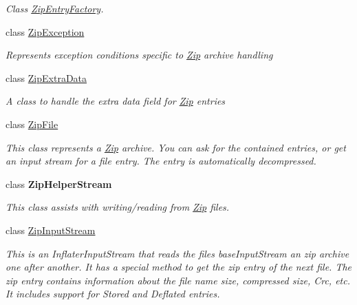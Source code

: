 \begin{DoxyCompactItemize}
\begin{DoxyCompactList}\small\item\em Class \hyperlink{class_i_c_sharp_code_1_1_sharp_zip_lib_1_1_zip_1_1_zip_entry_factory}{Zip\+Entry\+Factory}. \end{DoxyCompactList}\item 
class \hyperlink{class_i_c_sharp_code_1_1_sharp_zip_lib_1_1_zip_1_1_zip_exception}{Zip\+Exception}
\begin{DoxyCompactList}\small\item\em Represents exception conditions specific to \hyperlink{namespace_i_c_sharp_code_1_1_sharp_zip_lib_1_1_zip}{Zip} archive handling \end{DoxyCompactList}\item 
class \hyperlink{class_i_c_sharp_code_1_1_sharp_zip_lib_1_1_zip_1_1_zip_extra_data}{Zip\+Extra\+Data}
\begin{DoxyCompactList}\small\item\em A class to handle the extra data field for \hyperlink{namespace_i_c_sharp_code_1_1_sharp_zip_lib_1_1_zip}{Zip} entries \end{DoxyCompactList}\item 
class \hyperlink{class_i_c_sharp_code_1_1_sharp_zip_lib_1_1_zip_1_1_zip_file}{Zip\+File}
\begin{DoxyCompactList}\small\item\em This class represents a \hyperlink{namespace_i_c_sharp_code_1_1_sharp_zip_lib_1_1_zip}{Zip} archive. You can ask for the contained entries, or get an input stream for a file entry. The entry is automatically decompressed. \end{DoxyCompactList}\item 
class {\bfseries Zip\+Helper\+Stream}
\begin{DoxyCompactList}\small\item\em This class assists with writing/reading from \hyperlink{namespace_i_c_sharp_code_1_1_sharp_zip_lib_1_1_zip}{Zip} files. \end{DoxyCompactList}\item 
class \hyperlink{class_i_c_sharp_code_1_1_sharp_zip_lib_1_1_zip_1_1_zip_input_stream}{Zip\+Input\+Stream}
\begin{DoxyCompactList}\small\item\em This is an Inflater\+Input\+Stream that reads the files base\+Input\+Stream an zip archive one after another. It has a special method to get the zip entry of the next file. The zip entry contains information about the file name size, compressed size, Crc, etc. It includes support for Stored and Deflated entries. ~\newline

\end{DoxyCompactList}
\end{DoxyCompactItemize}
